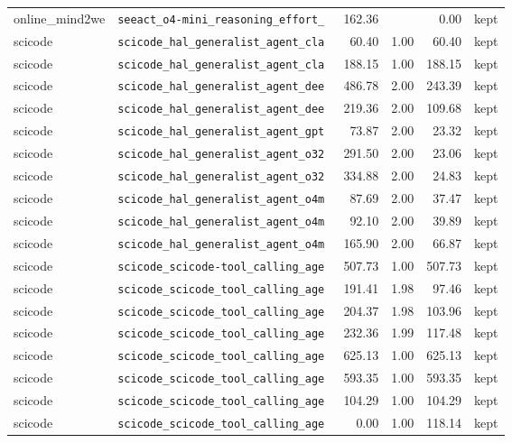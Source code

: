 {\begin{longtable}{llrrrl}
online\_mind2we & \texttt{\scriptsize seeact\_o4-mini\_reasoning\_effort\_~} & 162.36 &  & 0.00 & kept \\
scicode & \texttt{\scriptsize scicode\_hal\_generalist\_agent\_cla~} & 60.40 & 1.00 & 60.40 & kept \\
scicode & \texttt{\scriptsize scicode\_hal\_generalist\_agent\_cla~} & 188.15 & 1.00 & 188.15 & kept \\
scicode & \texttt{\scriptsize scicode\_hal\_generalist\_agent\_dee~} & 486.78 & 2.00 & 243.39 & kept \\
scicode & \texttt{\scriptsize scicode\_hal\_generalist\_agent\_dee~} & 219.36 & 2.00 & 109.68 & kept \\
scicode & \texttt{\scriptsize scicode\_hal\_generalist\_agent\_gpt~} & 73.87 & 2.00 & 23.32 & kept \\
scicode & \texttt{\scriptsize scicode\_hal\_generalist\_agent\_o32~} & 291.50 & 2.00 & 23.06 & kept \\
scicode & \texttt{\scriptsize scicode\_hal\_generalist\_agent\_o32~} & 334.88 & 2.00 & 24.83 & kept \\
scicode & \texttt{\scriptsize scicode\_hal\_generalist\_agent\_o4m~} & 87.69 & 2.00 & 37.47 & kept \\
scicode & \texttt{\scriptsize scicode\_hal\_generalist\_agent\_o4m~} & 92.10 & 2.00 & 39.89 & kept \\
scicode & \texttt{\scriptsize scicode\_hal\_generalist\_agent\_o4m~} & 165.90 & 2.00 & 66.87 & kept \\
scicode & \texttt{\scriptsize scicode\_scicode-tool\_calling\_age~} & 507.73 & 1.00 & 507.73 & kept \\
scicode & \texttt{\scriptsize scicode\_scicode\_tool\_calling\_age~} & 191.41 & 1.98 & 97.46 & kept \\
scicode & \texttt{\scriptsize scicode\_scicode\_tool\_calling\_age~} & 204.37 & 1.98 & 103.96 & kept \\
scicode & \texttt{\scriptsize scicode\_scicode\_tool\_calling\_age~} & 232.36 & 1.99 & 117.48 & kept \\
scicode & \texttt{\scriptsize scicode\_scicode\_tool\_calling\_age~} & 625.13 & 1.00 & 625.13 & kept \\
scicode & \texttt{\scriptsize scicode\_scicode\_tool\_calling\_age~} & 593.35 & 1.00 & 593.35 & kept \\
scicode & \texttt{\scriptsize scicode\_scicode\_tool\_calling\_age~} & 104.29 & 1.00 & 104.29 & kept \\
scicode & \texttt{\scriptsize scicode\_scicode\_tool\_calling\_age~} & 0.00 & 1.00 & 118.14 & kept \\

\end{longtable}}
